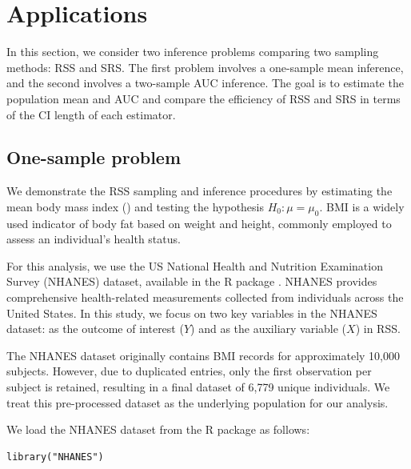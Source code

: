 \section{Applications}
In this section, we consider two inference problems comparing two sampling methods: RSS and SRS. The first problem involves a one-sample mean inference, and the second involves a two-sample AUC inference. The goal is to estimate the population mean and AUC and compare the efficiency of RSS and SRS in terms of the CI length of each estimator. 

\subsection{One-sample problem}\label{sec:app-one}

We demonstrate the RSS sampling and inference procedures by estimating the mean body mass index () and testing the hypothesis $H_0: \mu=\mu_0$. BMI is a widely used indicator of body fat based on weight and height, commonly employed to assess an individual's health status.

For this analysis, we use the US National Health and Nutrition Examination Survey (NHANES) dataset, available in the R package  \citep{NHANES}. NHANES provides comprehensive health-related measurements collected from individuals across the United States. In this study, we focus on two key variables in the NHANES dataset:  as the outcome of interest ($Y$) and  as the auxiliary variable ($X$) in RSS.

The NHANES dataset originally contains BMI records for approximately 10,000 subjects. However, due to duplicated entries, only the first observation per subject is retained, resulting in a final dataset of 6,779 unique individuals. We treat this pre-processed dataset as the underlying population for our analysis.


We load the NHANES dataset from the R package  as follows:
%
\begin{verbatim}
library("NHANES")
\end{verbatim}
%


